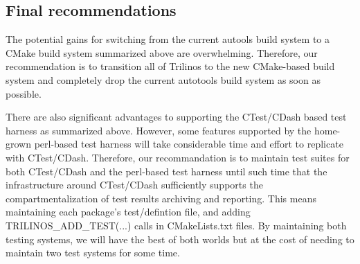\documentclass[pdf,ps2pdf,11pt]{SANDreport}
\begin{document}
%
\subsection{Final recommendations}
%

The potential gains for switching from the current autools build
system to a CMake build system summarized above are overwhelming.
Therefore, our recommendation is to transition all of Trilinos to the
new CMake-based build system and completely drop the current autotools
build system as soon as possible.

There are also significant advantages to supporting the CTest/CDash
based test harness as summarized above.  However, some features
supported by the home-grown perl-based test harness will take
considerable time and effort to replicate with CTest/CDash.
Therefore, our recommandation is to maintain test suites for both
CTest/CDash and the perl-based test harness until such time that the
infrastructure around CTest/CDash sufficiently supports the
compartmentalization of test results archiving and reporting.  This
means maintaining each package's test/defintion file, and adding
TRILINOS\_ADD\_TEST(...) calls in CMakeLists.txt files.  By
maintaining both testing systems, we will have the best of both worlds
but at the cost of needing to maintain two test systems for some time.


%
\clearpage




\begin{SANDdistribution}[NM]
\end{SANDdistribution}
\end{document}
